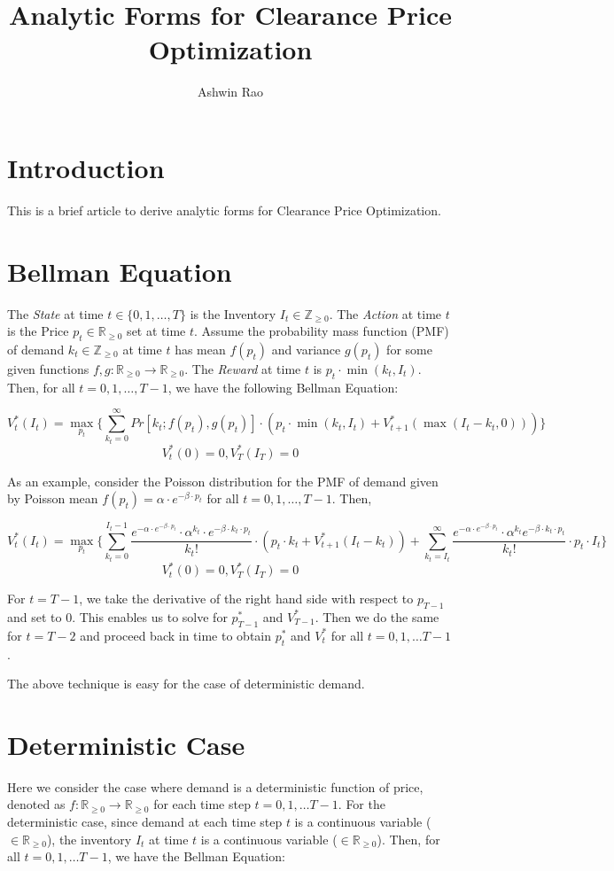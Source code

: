 \documentclass[12pt]{amsart}
\title{Analytic Forms for Clearance Price Optimization}
\author{Ashwin Rao}
\date{} %
\begin{document}
   
   \maketitle 
   \section{Introduction}
   This is a brief article to derive analytic forms for Clearance Price Optimization.    
   \section{Bellman Equation}
    The {\em State} at time $t \in \{0, 1, \ldots, T\}$ is the Inventory $I_t \in \mathbb{Z}_{\geq 0}$. The {\em Action} at time $t$ is the Price $p_t \in \mathbb{R}_{\geq 0}$ set at time $t$. Assume the probability mass function (PMF) of demand $k_t \in \mathbb{Z}_{\geq 0}$ at time $t$ has mean $f(p_t)$ and variance $g(p_t)$ for some given functions $f, g : \mathbb{R}_{\geq 0} \rightarrow \mathbb{R}_{\geq 0}$. The {\em Reward} at time $t$ is $p_t \cdot \min(k_t, I_t)$. Then, for all $t = 0, 1, \ldots, T-1$, we have the following Bellman Equation:
    
    $$V_t^*(I_t) = \max_{p_t} \{ \sum_{k_t=0}^{\infty} Pr[k_t; f(p_t), g(p_t)] \cdot (p_t \cdot \min(k_t, I_t) + V_{t+1}^*(\max(I_t - k_t, 0))) \}$$
    $$V_t^*(0) = 0, V_T^*(I_T) = 0$$
   
   As an example, consider the Poisson distribution for the PMF of demand given by Poisson mean $f(p_t) = \alpha \cdot e^{-\beta \cdot p_t}$ for all $t = 0, 1, \ldots, T-1$. Then,
   
    $$V_t^*(I_t) = \max_{p_t} \{ \sum_{k_t=0}^{I_t - 1} \frac {e^{-\alpha \cdot e^{-\beta \cdot p_t}} \cdot \alpha^{k_t} \cdot e^{-\beta \cdot k_t \cdot p_t}} {k_t!} \cdot (p_t \cdot k_t + V_{t+1}^*(I_t - k_t)) +  \sum_{k_t=I_t}^{\infty} \frac {e^{-\alpha \cdot e^{-\beta \cdot p_t}} \cdot \alpha^{k_t} e^{-\beta \cdot k_t \cdot p_t}} {k_t!} \cdot p_t \cdot I_t \}$$
    $$V_t^*(0) = 0, V_T^*(I_T) = 0$$
   
   For $t=T-1$, we take the derivative of the right hand side with respect to $p_{T-1}$ and set to 0. This enables us to solve for $p_{T-1}^*$ and $V_{T-1}^*$. Then we do the same for $t=T-2$ and proceed back in time to obtain $p_t^*$ and $V_t^*$ for all $t = 0, 1, \ldots T-1$.
   
   The above technique is easy for the case of deterministic demand.
   
   \section{Deterministic Case}
   Here we consider the case where demand is a deterministic function of price, denoted as $f : \mathbb{R}_{\geq 0} \rightarrow \mathbb{R}_{\geq 0}$ for each time step $t = 0, 1, \ldots T-1$. For the deterministic case, since demand at each time step $t$ is a continuous variable ($\in \mathbb{R}_{\geq 0}$), the inventory $I_t$ at time $t$ is a continuous variable ($\in \mathbb{R}_{\geq 0}$). Then, for all $t = 0, 1, \ldots T - 1$, we have the Bellman Equation:
   
\end{document}
